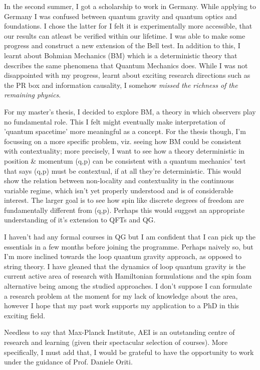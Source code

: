 In the second summer, I got a scholarship to work in Germany. While applying to Germany I was confused between quantum gravity and quantum optics and foundations. I chose the latter for I felt it is experimentally more accessible, that our results can atleast be verified within our lifetime. I was able to make some progress and construct a new extension of the Bell test. In addition to this, I learnt about Bohmian Mechanics (BM) which is a deterministic theory that describes the same phenomena that Quantum Mechanics does. While I was not disappointed with my progress, learnt about exciting research directions such as the PR box and information causality, I somehow \emph{missed the richness of the remaining physics}.


For my master's thesis, I decided to explore BM, a theory in which observers play no fundamental role. This I felt might eventually make interpretation of 'quantum spacetime' more meaningful as a concept. For the thesis though, I'm focussing on a more specific problem, viz. seeing how BM could be consistent with contextuality; more precisely, I want to see how a theory deterministic in position \& momentum (q,p) can be consistent with a quantum mechanics' test that says (q,p) must be contextual, if at all they're deterministic. This would show the relation between non-locality and contextuality in the continuous variable regime, which isn't yet properly understood and is of considerable interest. The larger goal is to see how spin like discrete degrees of freedom are fundamentally different from (q,p). Perhaps this would suggest an appropriate understanding of it's extension to QFTs and QG.


I haven't had any formal courses in QG but I am confident that I can pick up the essentials in a few months before joining the programme. Perhaps naively so, but I'm more inclined towards the loop quantum gravity approach, as opposed to string theory. I have gleaned that the dynamics of loop quantum gravity is the current active area of research with Hamiltonian formulations and the spin foam alternative being among the studied approaches. I don't suppose I can formulate a research problem at the moment for my lack of knowledge about the area, however I hope that my past work supports my application to a PhD in this exciting field.


Needless to say that Max-Planck Institute, AEI is an outstanding centre of research and learning (given their spectacular selection of courses). More specifically, I must add that, I would be grateful to have the opportunity to work under the guidance of Prof. Daniele Oriti.


